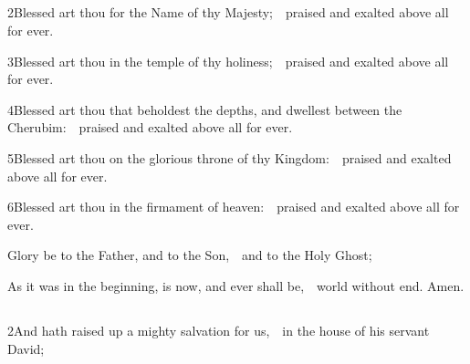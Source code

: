 

\subsection{}

2\enspace Blessed art thou for the Name of thy Majesty;\ \star\ praised and exalted above all for ever.

3\enspace Blessed art thou in the temple of thy holiness;\ \star\ praised and exalted above all for ever.

4\enspace Blessed art thou that beholdest the depths, and dwellest between the Cherubim:\ \star\ praised and exalted above all for ever.

5\enspace Blessed art thou on the glorious throne of thy Kingdom:\ \star\ praised and exalted above all for ever.

6\enspace Blessed art thou in the firmament of heaven:\ \star\ praised and exalted above all for ever.

Glory be to the Father, and to the Son,\ \star\ and to the Holy Ghost;

As it was in the beginning, is now, and ever shall be,\ \star\ world without end. Amen.

\subsubsection{}


\subsection{}


2\enspace And hath raised up a mighty salvation for us,\ \star\ in the house of his servant David;

